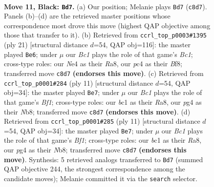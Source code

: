 \documentclass[11pt]{article}
\begin{document}
\clearpage

\begin{figure}[p]\centering
\begin{subfigure}{0.46\textwidth}\centering
\resizebox{\linewidth}{!}{%
\newchessgame
\chessboard[
  setfen={r1bqkb1r/pp4pp/4pp2/7P/2PNn1P1/8/PP3P2/R1BQKB1R b KQkq - 0 11},
  showmover=false,
  pgfstyle=straightmove, color=movearrow, markmove={c8-d7}
]}
\caption{}
\end{subfigure}\hfill
\begin{subfigure}{0.46\textwidth}\centering
\resizebox{\linewidth}{!}{%
\newchessgame
\chessboard[
  setfen={r1bqkb1r/1pp2ppp/8/pP6/2nB4/P3P3/5PPP/RN1QKB1R b KQkq - 0 11},
  showmover=false,
  pgfstyle=straightmove, color=movearrow, markmove={c8-e6}
]}
\caption{}
\end{subfigure}
\\[4pt]
\begin{subfigure}{0.46\textwidth}\centering
\resizebox{\linewidth}{!}{%
\newchessgame
\chessboard[
  setfen={rnbqkb1r/pp3ppp/2p2p2/8/2BP4/8/PPP2PPP/R1BQK1NR b KQkq - 1 6},
  showmover=false,
  pgfstyle=straightmove, color=movearrow, markmove={f8-e7}
]}
\caption{}
\end{subfigure}\hfill
\begin{subfigure}{0.46\textwidth}\centering
\resizebox{\linewidth}{!}{%
\newchessgame
\chessboard[
  setfen={rnbqkb1r/pp3ppp/2p2p2/8/2BP4/8/PPP2PPP/R1BQK1NR b KQkq - 1 6},
  showmover=false,
  pgfstyle=straightmove, color=movearrow, markmove={f8-e7}
]}
\caption{}
\end{subfigure}
\caption{\textbf{Move 11, Black: \texttt{Bd7}.} (a) Our position; Melanie plays \texttt{Bd7} (\texttt{c8d7}). Panels (b)--(d) are the retrieved master positions whose correspondence most drove this move (highest QAP objective among those that transfer to it). (b) Retrieved from \texttt{ccrl\_top\_p0003\#1395} (ply 21) [structural distance $d$=54, QAP obj=116]: the master played \texttt{Be6}; under $\mu$ our \emph{Bc1} plays the role of that game's \emph{Bc1}; cross-type roles: our \emph{N}e4 as their \emph{R}a8, our \emph{p}c4 as their \emph{B}f8; transferred move \texttt{c8d7} \textbf{(endorses this move)}. (c) Retrieved from \texttt{ccrl\_top\_p0001\#284} (ply 11) [structural distance $d$=54, QAP obj=34]: the master played \texttt{Be7}; under $\mu$ our \emph{Bc1} plays the role of that game's \emph{Bf1}; cross-type roles: our \emph{b}c1 as their \emph{R}a8, our \emph{p}g4 as their \emph{N}b8; transferred move \texttt{c8d7} \textbf{(endorses this move)}. (d) Retrieved from \texttt{ccrl\_top\_p0001\#285} (ply 11) [structural distance $d$=54, QAP obj=34]: the master played \texttt{Be7}; under $\mu$ our \emph{Bc1} plays the role of that game's \emph{Bf1}; cross-type roles: our \emph{b}c1 as their \emph{R}a8, our \emph{p}g4 as their \emph{N}b8; transferred move \texttt{c8d7} \textbf{(endorses this move)}. Synthesis: 5 retrieved analogs transferred to \texttt{Bd7} (summed QAP objective 244, the strongest correspondence among the candidate moves); Melanie committed it via the \texttt{search} selector.}
\label{fig:thought-m21}
\end{figure}
\end{document}
